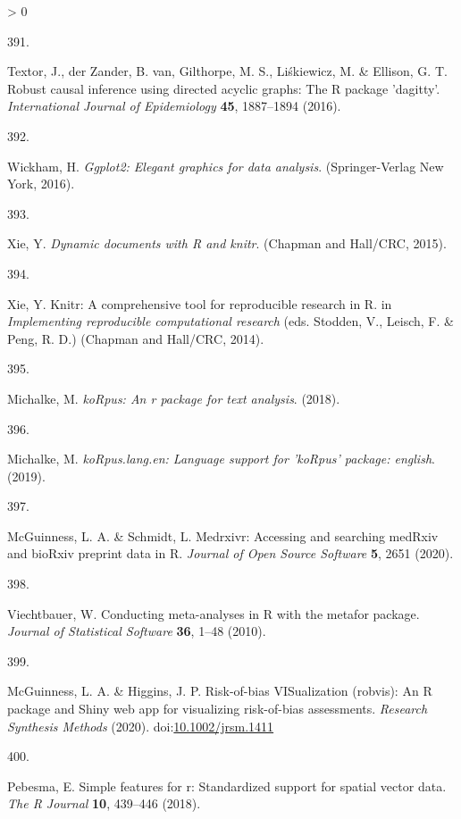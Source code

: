 \documentclass[a4paper, twoside]{templates/ociamthesis}
\newlength{\cslhangindent}
\newlength{\csllabelwidth}
\newenvironment{CSLReferences}[3] %
 {%
  \setlength{\parindent}{0pt}
  \ifodd #1 \everypar{\setlength{\hangindent}{\cslhangindent}}\ignorespaces\fi
  \ifnum #2 > 0
  \setlength{\parskip}{#2\baselineskip}
  \fi
 }%
 {}
\newcommand{\CSLLeftMargin}[1]{\parbox[t]{\maxof{\widthof{#1}}{\csllabelwidth}}{#1}}
\newcommand{\CSLRightInline}[1]{\parbox[t]{\linewidth - \csllabelwidth}{#1}}
\begin{document}
\begin{CSLReferences}{0}{0}
\leavevmode\hypertarget{ref-dagitty2016}{}%
\CSLLeftMargin{391. }
\CSLRightInline{Textor, J., der Zander, B. van, Gilthorpe, M. S., Liśkiewicz, M. \& Ellison, G. T. Robust causal inference using directed acyclic graphs: The {R} package 'dagitty'. \emph{International Journal of Epidemiology} \textbf{45}, 1887--1894 (2016).}

\leavevmode\hypertarget{ref-ggplot22016}{}%
\CSLLeftMargin{392. }
\CSLRightInline{Wickham, H. \emph{Ggplot2: Elegant graphics for data analysis}. ({Springer-Verlag New York}, 2016).}

\leavevmode\hypertarget{ref-knitr2015}{}%
\CSLLeftMargin{393. }
\CSLRightInline{Xie, Y. \emph{Dynamic documents with {R} and knitr}. ({Chapman and Hall/CRC}, 2015).}

\leavevmode\hypertarget{ref-knitr2014}{}%
\CSLLeftMargin{394. }
\CSLRightInline{Xie, Y. Knitr: A comprehensive tool for reproducible research in {R}. in \emph{Implementing reproducible computational research} (eds. Stodden, V., Leisch, F. \& Peng, R. D.) ({Chapman and Hall/CRC}, 2014).}

\leavevmode\hypertarget{ref-koRpus2018}{}%
\CSLLeftMargin{395. }
\CSLRightInline{Michalke, M. \emph{{koRpus}: An r package for text analysis}. (2018).}

\leavevmode\hypertarget{ref-koRpus.lang.en2019}{}%
\CSLLeftMargin{396. }
\CSLRightInline{Michalke, M. \emph{{koRpus}.lang.en: Language support for '{koRpus}' package: english}. (2019).}

\leavevmode\hypertarget{ref-medrxivr2020}{}%
\CSLLeftMargin{397. }
\CSLRightInline{McGuinness, L. A. \& Schmidt, L. Medrxivr: Accessing and searching {medRxiv} and {bioRxiv} preprint data in {R}. \emph{Journal of Open Source Software} \textbf{5}, 2651 (2020).}

\leavevmode\hypertarget{ref-metafor2010}{}%
\CSLLeftMargin{398. }
\CSLRightInline{Viechtbauer, W. Conducting meta-analyses in {R} with the {metafor} package. \emph{Journal of Statistical Software} \textbf{36}, 1--48 (2010).}

\leavevmode\hypertarget{ref-robvis2020}{}%
\CSLLeftMargin{399. }
\CSLRightInline{McGuinness, L. A. \& Higgins, J. P. Risk-of-bias {VISualization} (robvis): An {R} package and {Shiny} web app for visualizing risk-of-bias assessments. \emph{Research Synthesis Methods} (2020). doi:\href{https://doi.org/10.1002/jrsm.1411}{10.1002/jrsm.1411}}

\leavevmode\hypertarget{ref-sf2018}{}%
\CSLLeftMargin{400. }
\CSLRightInline{Pebesma, E. Simple features for r: Standardized support for spatial vector data. \emph{The R Journal} \textbf{10}, 439--446 (2018).}


\end{CSLReferences}
\end{document}
